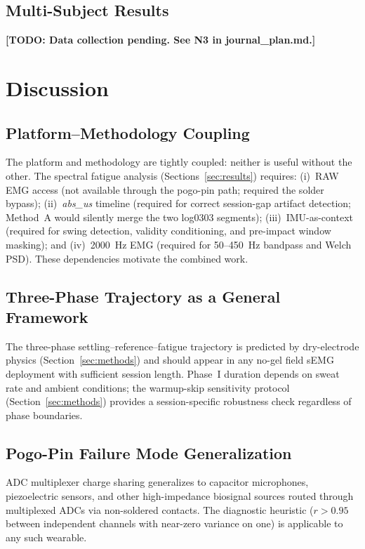 \documentclass[sensors,article,submit,pdftex,moreauthors]{Definitions/mdpi}
\begin{document}
\subsection{Multi-Subject Results}
\label{sec:multi_subject}

\textbf{[TODO: Data collection pending. See N3 in journal\_plan.md.]}

\section{Discussion}
\label{sec:discussion}

\subsection{Platform--Methodology Coupling}

The platform and methodology are tightly coupled: neither is useful without the other.
The spectral fatigue analysis (Sections~\ref{sec:results}) requires: (i)~RAW EMG access
(not available through the pogo-pin path; required the solder bypass); (ii)~\textit{abs\_us}
timeline (required for correct session-gap artifact detection; Method~A would silently
merge the two log0303 segments); (iii)~IMU-as-context (required for swing detection,
validity conditioning, and pre-impact window masking); and (iv)~2000~Hz EMG (required
for 50--450~Hz bandpass and Welch PSD). These dependencies motivate the combined work.

\subsection{Three-Phase Trajectory as a General Framework}

The three-phase settling--reference--fatigue trajectory is predicted by dry-electrode
physics (Section~\ref{sec:methods}) and should appear in any no-gel field sEMG
deployment with sufficient session length. Phase~I duration depends on sweat rate and
ambient conditions; the warmup-skip sensitivity protocol (Section~\ref{sec:methods})
provides a session-specific robustness check regardless of phase boundaries.

\subsection{Pogo-Pin Failure Mode Generalization}

ADC multiplexer charge sharing generalizes to capacitor microphones, piezoelectric
sensors, and other high-impedance biosignal sources routed through multiplexed ADCs
via non-soldered contacts. The diagnostic heuristic ($r > 0.95$ between independent
channels with near-zero variance on one) is applicable to any such wearable.
\end{document}
